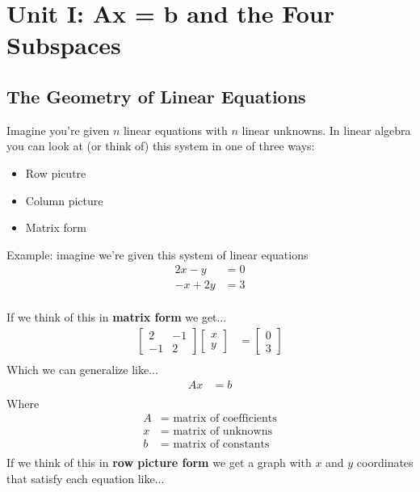 \documentclass[12pt]{article}
\begin{document}
\section{Unit I: Ax = b and the Four Subspaces}\label{u1}

\subsection{The Geometry of Linear Equations}\label{u1.1}


Imagine you're given $n $ linear equations with $n $ linear unknowns. In linear algebra you can look at (or think of) this system in one of three ways:
\begin{itemize}
    \item Row picutre
    \item Column picture
    \item Matrix form
\end{itemize}

Example: imagine we're given this system of linear equations
\begin{align*}
    2x - y &= 0\\
    -x + 2y &= 3\\
\end{align*}

If we think of this in \textbf{matrix form} we get...
\begin{align*}
  \begin{bmatrix}
    2 & -1\\
    -1 & 2
  \end{bmatrix}
  \begin{bmatrix}
  x\\
  y
  \end{bmatrix}
  &= 
  \begin{bmatrix}
  0\\
  3
  \end{bmatrix}\\
\end{align*}
Which we can generalize like...
\begin{align*}
  Ax &= b\\
\end{align*}
Where
\begin{align*}
  A &= \text{ matrix of coefficients}\\
  x &= \text{ matrix of unknowns}\\
  b &= \text{ matrix of constants }\\
\end{align*}
If we think of this in \textbf{row picture form} we get a graph with $x $ and $y $ coordinates that satisfy each equation like...
\end{document}
